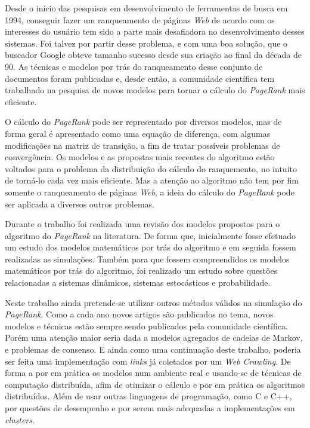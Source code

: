 \documentclass[a4paper]{report} %
\begin{document}
Desde o início das pesquisas em desenvolvimento de ferramentas de busca em 1994, conseguir fazer um ranqueamento de páginas \textit{Web} de acordo com os interesses do usuário tem sido a parte mais desafiadora no desenvolvimento desses sistemas. Foi talvez por partir desse problema, e com uma boa solução, que o buscador Google obteve tamanho sucesso desde sua criação ao final da década de 90. As técnicas e modelos por trás do ranqueamento desse conjunto de documentos foram publicadas e, desde então, a comunidade científica tem trabalhado na pesquisa de novos modelos para tornar o cálculo do \textit{PageRank} mais eficiente.

O cálculo do \textit{PageRank} pode ser representado por diversos modelos, mas de forma geral é apresentado como uma equação de diferença, com algumas modificações na matriz de transição, a fim de tratar possíveis problemas de convergência. Os modelos e as propostas mais recentes do algoritmo estão voltados para o problema da distribuição do cálculo do ranquemento, no intuito de torná-lo cada vez mais eficiente. Mas a atenção ao algoritmo não tem por fim somente o ranqueamento de páginas \textit{Web}, a ideia do cálculo do \textit{PageRank} pode ser aplicada a diversos outros problemas.

Durante o trabalho foi realizada uma revisão dos modelos propostos para o algoritmo do \textit{PageRank} na literatura. De forma que, inicialmente fosse efetuado um estudo dos modelos matemáticos por trás do algoritmo e em seguida fossem realizadas as simulações. Também para que fossem compreendidos os modelos matemáticos por trás do algoritmo, foi realizado um estudo sobre questões relacionadas a sistemas dinâmicos, sistemas estocásticos e probabilidade.

Neste trabalho ainda pretende-se utilizar outros métodos válidos na simulação do \textit{PageRank}. Como a cada ano novos artigos são publicados no tema, novos modelos e técnicas estão sempre sendo publicados pela comunidade científica. Porém uma atenção maior seria dada a modelos agregados de cadeias de Markov, e problemas de consenso. E ainda como uma continuação deste trabalho, poderia ser feita uma implementação com \textit{links} já coletados por um \textit{Web Crawling}. De forma a por em prática os modelos num ambiente real e usando-se de técnicas de computação distribuída, afim de otimizar o cálculo e por em prática os algoritmos distribuídos. Além de usar outras linguagens de programação, como C e C++, por questões de desempenho e por serem mais adequadas a implementações em \textit{clusters}.




\end{document}
